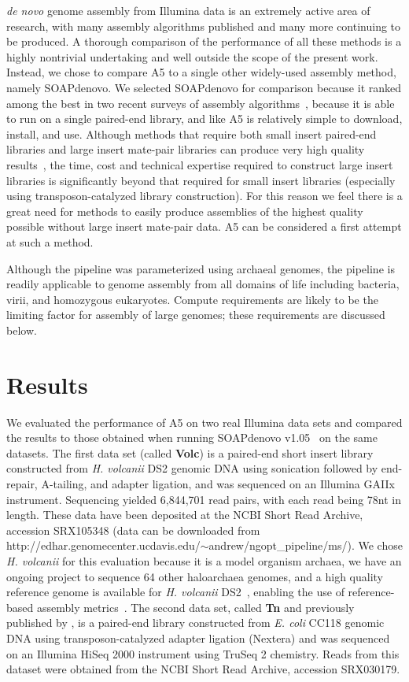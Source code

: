\documentclass[10pt]{article}
\begin{document}
\emph{de novo} genome assembly from Illumina data is an extremely active area of research, with many assembly algorithms published and many more continuing to be produced.
A thorough comparison of the performance of all these methods is a highly nontrivial undertaking and well outside the scope of the present  
work. Instead, we chose to compare A5 to a single other widely-used assembly method, namely SOAPdenovo. We selected SOAPdenovo for comparison
because it ranked among the best in two recent surveys of assembly algorithms~\cite{Earl2011,Salzberg2011}, because it is able to run on a single paired-end
library, and like A5 is relatively simple to download, install, and use. Although methods that require both small insert paired-end libraries
and large insert mate-pair libraries can produce very high quality results~\cite{Gnerre2011}, the time, cost and technical expertise required to construct large insert
libraries is significantly beyond that required for small insert libraries (especially using transposon-catalyzed library construction).
For this reason we feel there is a great need for methods to easily produce assemblies of the highest quality possible without large insert mate-pair data.
A5 can be considered a first attempt at such a method.

Although the pipeline was parameterized using archaeal genomes, the pipeline is readily applicable to genome assembly from all domains of life including bacteria, virii, and homozygous eukaryotes. Compute requirements are likely to be the limiting factor for assembly of large genomes; these requirements are discussed below.

\section*{Results}

We evaluated the performance of A5 on two real Illumina data sets and compared the results to
those obtained when running SOAPdenovo v1.05~\cite{Li2010} on the same datasets. The first data set (called \textbf{Volc}) is a paired-end short insert library constructed from \emph{H. volcanii} DS2 genomic DNA 
using sonication followed by end-repair, A-tailing, and adapter ligation, and was sequenced on an Illumina GAIIx instrument.
Sequencing yielded 6,844,701 read pairs, with each read being 78nt in length. These data have been deposited at the NCBI Short Read Archive, accession SRX105348 (data can be downloaded
from http://edhar.genomecenter.ucdavis.edu/${\sim}$andrew/ngopt\_pipeline/ms/). 
We chose \emph{H. volcanii} for this evaluation because it is a model organism archaea, we have an ongoing project to sequence 64 other haloarchaea genomes, and a high quality reference genome is available for \emph{H. volcanii} DS2~\cite{Hartman2010}, enabling the use of reference-based assembly metrics~\cite{Darling2011}.  
The second data set, called \textbf{Tn} and previously published by \cite{Adey2010}, is a paired-end library constructed from \emph{E. coli} CC118 genomic DNA
using transposon-catalyzed adapter ligation (Nextera) and was sequenced on an Illumina HiSeq 2000 instrument using TruSeq 2 chemistry. 
Reads from this dataset were obtained from the NCBI Short Read Archive, accession SRX030179.
\end{document}
